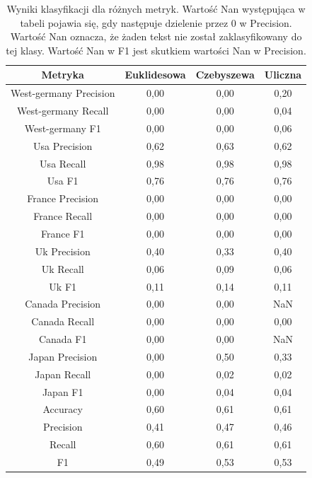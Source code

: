 \documentclass{classrep}
\begin{document}
\newpage
\begin{table}[h!]
\caption{Wyniki klasyfikacji dla różnych metryk. Wartość Nan występująca w tabeli pojawia się, gdy następuje dzielenie przez 0 w Precision. Wartość Nan oznacza, że żaden tekst nie został zaklasyfikowany do tej klasy. Wartość Nan w F1 jest skutkiem wartości Nan w Precision.}
\centering
\vspace{0.1cm}
 \begin{tabular}{c c c c}

    \textbf{Metryka} & \textbf{Euklidesowa}   & \textbf{Czebyszewa}  & \textbf{Uliczna}  \\

\hline
West-germany Precision 	& 0,00 & 0,00 & 0,20 \\
West-germany Recall 		& 0,00 & 0,00 & 0,04 \\
West-germany F1		& 0,00 & 0,00 & 0,06 \\
\hline
Usa Precision 			& 0,62 & 0,63 & 0,62 \\
Usa Recall				& 0,98 & 0,98 & 0,98 \\
Usa F1			 	& 0,76 & 0,76 & 0,76 \\
\hline
France Precision 		& 0,00 & 0,00 & 0,00 \\
France Recall 			& 0,00 & 0,00 & 0,00 \\
France F1 				& 0,00 & 0,00 & 0,00 \\
\hline
Uk Precision 			& 0,40 & 0,33 & 0,40 \\
Uk Recall 				& 0,06 & 0,09 & 0,06 \\
Uk F1 				& 0,11 & 0,14 & 0,11 \\
\hline
Canada Precision		& 0,00 & 0,00 & NaN \\
Canada Recall 			& 0,00 & 0,00 & 0,00 \\
Canada F1 			& 0,00 & 0,00 & NaN \\
\hline
Japan Precision 		& 0,00 & 0,50 & 0,33 \\
Japan Recall 			& 0,00 & 0,02 & 0,02 \\
Japan F1 				& 0,00 & 0,04 & 0,04 \\
\hline
Accuracy 				& 0,60 & 0,61 & 0,61 \\
Precision 				& 0,41 & 0,47 & 0,46 \\
Recall 				& 0,60 & 0,61 & 0,61 \\
F1 					& 0,49 & 0,53 & 0,53 \\

\end {tabular}
\label {t2}
\end{table}
\end{document}
